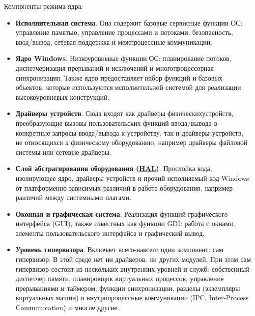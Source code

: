 \documentclass[14pt, a4paper]{article}
\begin{document}
Компоненты режима ядра:
\begin{itemize}
    \item \textbf{Исполнительная система}. Она содержит базовые сервисные функции
    ОС: управление памятью, управление процессами и потоками, безопасность,
    ввод/вывод, сетевая поддержка и межпроцессные коммуникации.

    \item \textbf{Ядро Windows}. Низкоуровневые функции ОС: планирование потоков,
    диспетчеризация прерываний и исключений и многопроцессорная синхронизация.
    Также ядро предоставляет набор функций и базовых объектов, которые используются
    исполнительной системой для реализации высокоуровневых конструкций.

    \item \textbf{Драйверы устройств}. Сюда входят как драйверы физических\linebreak[4]
    устройств, преобразующие вызовы пользовательских функций \linebreak[4]ввода/вывода в конкретные запросы
    ввода/вывода к устройству, так и драйверы устройств, не относящихся к
    физическому оборудованию, например драйверы файловой системы или сетевые драйверы.

    \item \textbf{Слой абстрагирования оборудования (\underline{HAL})}. Прослойка кода, изолирующее ядро,
    драйверы устройств и прочий исполняемый код Windows от платформенно-зависимых различий
    в работе оборудования, например различий между системными платами.

    \item \textbf{Оконная и графическая система}. Реализация функций графического интерфейса (GUI),
    также известных как функции GDI: работа с окнами, элементы пользовательского интерфейса и графический вывод.

    \item \textbf{Уровень гипервизора}. Включает всего-навсего один компонент:
    сам гипервизор. В этой среде нет ни драйверов, ни других модулей.
    При этом сам гипервизор состоит из нескольких внутренних уровней и служб:
    собственный диспетчер памяти, планировщик виртуальных процессов, управление
    прерываниями и таймером, функции синхронизации, разделы
    (экземпляры виртуальных машин) и внутрипроцессные коммуникации
    (IPC, Inter-Process Communication) и многие другие.
\end{itemize}
\end{document}
